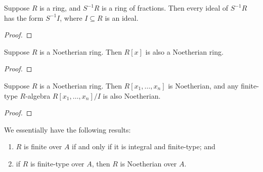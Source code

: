 \begin{lemma}
    Suppose \(R\) is a ring, and \(S^{-1}R\) is a ring of fractions.
    Then every ideal of \(S^{-1}R\) has the form \(S^{-1}I\),
    where \(I \subseteq R\) is an ideal.
\end{lemma}
\begin{proof}
    
\end{proof}
\begin{theorem}
    Suppose \(R\) is a Noetherian ring.
    Then \(R[x]\) is also a Noetherian ring.
\end{theorem}
\begin{proof}
    
\end{proof}
\begin{corollary}
    Suppose \(R\) is a Noetherian ring.
    Then \(R[x_1,\hdots,x_n]\) is Noetherian,
    and any finite-type \(R\)-algebra \(R[x_1,\hdots,x_n]/I\) is also Noetherian.
\end{corollary}
\begin{proof}
    
\end{proof}
\begin{remark}
    We essentially have the following results:
    \begin{enumerate}[label={(\roman*)}, itemsep=0mm]
        \item \(R\) is finite over \(A\) if and only if it is integral and finite-type; and
        \item if \(R\) is finite-type over \(A\), then \(R\) is Noetherian over \(A\).
    \end{enumerate}
\end{remark}

